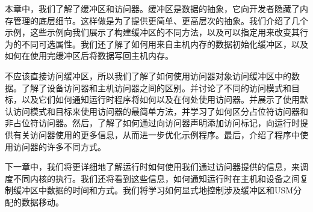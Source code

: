 本章中，我们了解了缓冲区和访问器。缓冲区是数据的抽象，它向开发者隐藏了内存管理的底层细节。这样做是为了提供更简单、更高层次的抽象。我们介绍了几个示例，这些示例向我们展示了构建缓冲区的不同方法，以及可以指定用来改变其行为的不同可选属性。我们还了解了如何用来自主机内存的数据初始化缓冲区，以及如何在使用完缓冲区后将数据写回主机内存。\par

不应该直接访问缓冲区，所以我们了解了如何使用访问器对象访问缓冲区中的数据。了解了设备访问器和主机访问器之间的区别。并讨论了不同的访问模式和目标，以及它们如何通知运行时程序将如何以及在何处使用访问器。并展示了使用默认访问模式和目标来使用访问器的最简单方法，并学习了如何区分占位符访问器和非占位符访问器。然后，了解了如何通过向访问器声明添加访问标记，向运行时提供有关访问器使用的更多信息，从而进一步优化示例程序。最后，介绍了程序中使用访问器的许多不同方式。\par

下一章中，我们将更详细地了解运行时如何使用我们通过访问器提供的信息，来调度不同内核的执行。我们还将看到这些信息，如何通知运行时在主机和设备之间复制缓冲区中数据的时间和方式。我们将学习如何显式地控制涉及缓冲区和USM分配的数据移动。\par

\newpage